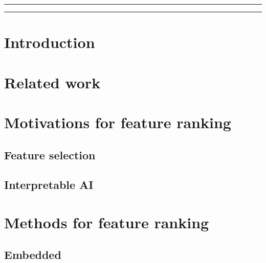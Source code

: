 \documentclass{article}
\begin{document}
\hrule
\begin{abstract}
\end{abstract}
\hrule
\begin{quote}
    
\end{quote}

\tableofcontents
\section{Introduction}


\section{Related work}


    
\section{Motivations for feature ranking}
    \subsection{Feature selection}
    \subsection{Interpretable AI}

\section{Methods for feature ranking}
    \subsection{Embedded}
\end{document}
